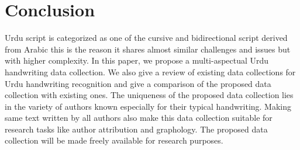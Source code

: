\documentclass[a4paper,conference]{IEEEtran}
\begin{document}
\section{Conclusion} \label{Con}
Urdu script is categorized as one of the cursive and bidirectional script derived from Arabic this is the reason it shares almost similar challenges and issues but with higher complexity. In this paper, we propose a multi-aspectual Urdu handwriting data collection. We also give a review of existing data collections for Urdu handwriting recognition and give a comparison of the proposed data collection with existing ones. The uniqueness of the proposed data collection lies in the variety of authors known especially for their typical handwriting. Making same text written by all authors also make this data collection suitable for research tasks like author attribution and graphology. The proposed data collection will be made freely available for research purposes.  
\end{document}

